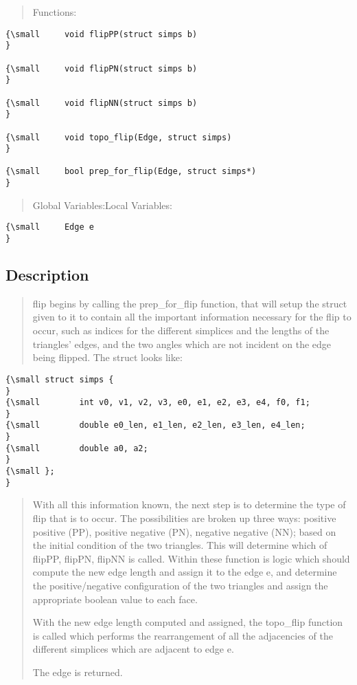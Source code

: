 \begin{quotation}
Functions:
\end{quotation}

{\small }
\begin{verbatim}
{\small     void flipPP(struct simps b)
}
 
{\small     void flipPN(struct simps b)
}
 
{\small     void flipNN(struct simps b)
}
 
{\small     void topo_flip(Edge, struct simps)
}
 
{\small     bool prep_for_flip(Edge, struct simps*)
}
\end{verbatim}

\begin{quotation}
Global Variables:Local Variables:
\end{quotation}

{\small }
\begin{verbatim}
{\small     Edge e
}
\end{verbatim}

\subsection*{Description}

\begin{quotation}
flip begins by calling the prep\_for\_flip function, that will setup the
struct given to it to contain all the important information necessary for
the flip to occur, such as indices for the different simplices and the
lengths of the triangles' edges, and the two angles which are not incident
on the edge being flipped. The struct looks like:
\end{quotation}

{\small }
\begin{verbatim}
{\small struct simps {
}
{\small        int v0, v1, v2, v3, e0, e1, e2, e3, e4, f0, f1;
}
{\small        double e0_len, e1_len, e2_len, e3_len, e4_len;
}
{\small        double a0, a2;
}
{\small };
}
\end{verbatim}

\begin{quotation}
With all this information known, the next step is to determine the type of
flip that is to occur. The possibilities are broken up three ways: positive
positive (PP), positive negative (PN), negative negative (NN); based on the
initial condition of the two triangles. This will determine which of flipPP,
flipPN, flipNN is called. Within these function is logic which should
compute the new edge length and assign it to the edge e, and determine the
positive/negative configuration of the two triangles and assign the
appropriate boolean value to each face.

With the new edge length computed and assigned, the topo\_flip function is
called which performs the rearrangement of all the adjacencies of the
different simplices which are adjacent to edge e.

The edge is returned.
\end{quotation}

